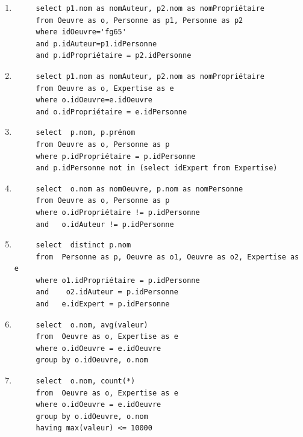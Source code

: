 \begin{enumerate}
  \item \begin{verbatim}
     select p1.nom as nomAuteur, p2.nom as nomPropriétaire
     from Oeuvre as o, Personne as p1, Personne as p2
     where idOeuvre='fg65'
     and p.idAuteur=p1.idPersonne
     and p.idPropriétaire = p2.idPersonne
  \end{verbatim}
  
  \item 
  \begin{verbatim}
     select p1.nom as nomAuteur, p2.nom as nomPropriétaire
     from Oeuvre as o, Expertise as e
     where o.idOeuvre=e.idOeuvre
     and o.idPropriétaire = e.idPersonne
  \end{verbatim}
  
   \item \begin{verbatim}
     select  p.nom, p.prénom
     from Oeuvre as o, Personne as p
     where p.idPropriétaire = p.idPersonne
     and p.idPersonne not in (select idExpert from Expertise)
  \end{verbatim}
  
     \item \begin{verbatim}
     select  o.nom as nomOeuvre, p.nom as nomPersonne
     from Oeuvre as o, Personne as p
     where o.idPropriétaire != p.idPersonne
     and   o.idAuteur != p.idPersonne
  \end{verbatim}
  
     \item \begin{verbatim}
     select  distinct p.nom
     from  Personne as p, Oeuvre as o1, Oeuvre as o2, Expertise as e
     where o1.idPropriétaire = p.idPersonne
     and    o2.idAuteur = p.idPersonne
     and   e.idExpert = p.idPersonne 
  \end{verbatim}
  
       \item \begin{verbatim}
     select  o.nom, avg(valeur)
     from  Oeuvre as o, Expertise as e
     where o.idOeuvre = e.idOeuvre
     group by o.idOeuvre, o.nom
  \end{verbatim}
  
        \item \begin{verbatim}
     select  o.nom, count(*)
     from  Oeuvre as o, Expertise as e
     where o.idOeuvre = e.idOeuvre
     group by o.idOeuvre, o.nom
     having max(valeur) <= 10000
  \end{verbatim}
\end{enumerate}


